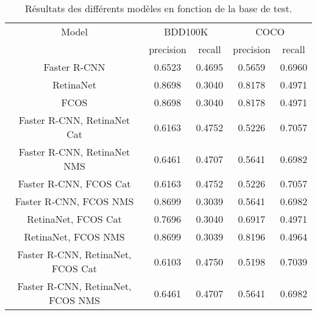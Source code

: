 \documentclass{article}
\begin{document}
\begin{table}[h!]
\centering
\begin{tabular}{|c||c|c||c|c|} 
 \hline
 Model & \multicolumn{2}{|c||}{BDD100K} & \multicolumn{2}{|c|}{COCO} \\
  & precision & recall  & precision & recall  \\ [0.5ex] 
 \hline
 Faster R-CNN & 0.6523 & 0.4695 & 0.5659 & 0.6960 \\ 
 \hline
 RetinaNet & 0.8698 & 0.3040 & 0.8178 & 0.4971 \\
 \hline
 FCOS & 0.8698 & 0.3040 & 0.8178 & 0.4971 \\
 \hline
 Faster R-CNN, RetinaNet Cat & 0.6163 & 0.4752 & 0.5226 & 0.7057 \\
 \hline
 Faster R-CNN, RetinaNet NMS & 0.6461 & 0.4707 & 0.5641 & 0.6982 \\ 
 \hline
 Faster R-CNN, FCOS Cat & 0.6163 & 0.4752 & 0.5226 & 0.7057 \\ 
 \hline
 Faster R-CNN, FCOS NMS & 0.8699 & 0.3039 & 0.5641 & 0.6982 \\  
 \hline
 RetinaNet, FCOS Cat & 0.7696  & 0.3040 & 0.6917 & 0.4971 \\  
 \hline
 RetinaNet, FCOS NMS & 0.8699  & 0.3039 & 0.8196 & 0.4964 \\ 
 \hline
 Faster R-CNN, RetinaNet, FCOS Cat & 0.6103 & 0.4750 & 0.5198 & 0.7039\\ 
 \hline
 Faster R-CNN, RetinaNet, FCOS NMS & 0.6461 & 0.4707 & 0.5641 & 0.6982\\  
 \hline
\end{tabular}
\caption{Résultats des différents modèles en fonction de la base de test.}
\label{table:data}
\end{table}
\end{document}
